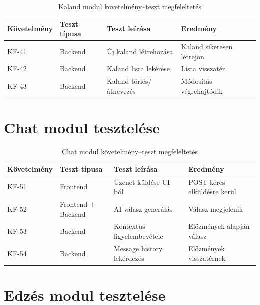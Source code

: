\documentclass[
]{thesis-ekf}
\theoremstyle{definition}
\theoremstyle{remark}
\begin{document}
\begin{table}[!ht]
\centering
\begin{tabularx}{\textwidth}{|l|l|X|X|}
\hline
\textbf{Követelmény} & \textbf{Teszt típusa} & \textbf{Teszt leírása} & \textbf{Eredmény} \\ \hline
KF-41 & Backend & Új kaland létrehozása & Kaland sikeresen létrejön \\ \hline
KF-42 & Backend & Kaland lista lekérése & Lista visszatér \\ \hline
KF-43 & Backend & Kaland törlés/átnevezés & Módosítás végrehajtódik \\ \hline
\end{tabularx}
\caption{Kaland modul követelmény–teszt megfeleltetés}
\label{tab_adventure_tests}
\end{table}

\section{Chat modul tesztelése}

\begin{table}[H]
\centering
\begin{tabularx}{\textwidth}{|l|l|X|X|}
\hline
\textbf{Követelmény} & \textbf{Teszt típusa} & \textbf{Teszt leírása} & \textbf{Eredmény} \\ \hline
KF-51 & Frontend & Üzenet küldése UI-ból & POST kérés elküldésre kerül \\ \hline
KF-52 & Frontend + Backend & AI válasz generálás & Válasz megjelenik \\ \hline
KF-53 & Backend & Kontextus figyelembevétele & Előzmények alapján válasz \\ \hline
KF-54 & Backend & Message history lekérdezés & Előzmények visszatérnek \\ \hline
\end{tabularx}
\caption{Chat modul követelmény–teszt megfeleltetés}
\label{tab_chat_tests}
\end{table}

\section{Edzés modul tesztelése}
\end{document}
